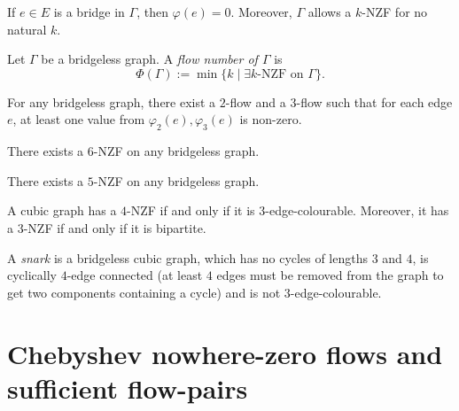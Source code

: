 \begin{claim}
    If $e\in E$ is a bridge in $\Gamma$, then $\varphi(e)=0$. Moreover, $\Gamma$ allows a $k$-NZF for no natural $k$.
\end{claim}

\begin{definition}
	Let $\Gamma$ be a bridgeless graph. A \emph{flow number of $\Gamma$} is
	\begin{equation*}
		\Phi(\Gamma) := \min\{k\mid\exists k\text{-NZF on }\Gamma\}.\label{eq:flow_number}
	\end{equation*}
\end{definition}

\begin{lemma} \emph{\cite[p. 132]{seymour}}
    For any bridgeless graph, there exist a $2$-flow and a $3$-flow such that for each edge $e$, at least one value from $\varphi_2(e), \varphi_3(e)$ is non-zero.\label{lem:2_flow_3_flow_seymour}
\end{lemma}

\begin{theorem} \emph{\cite[p. 133]{seymour}}
    There exists a $6$-NZF on any bridgeless graph.\label{th:6_flow}
\end{theorem}

\begin{conjecture} \emph{\cite[p. 83]{tutte}}
    There exists a $5$-NZF on any bridgeless graph.\label{conj:5_flow}
\end{conjecture}

\begin{proposition} \emph{\cite[pp. 160, 161]{diestel}}
    A cubic graph has a $4$-NZF if and only if it is $3$-edge-colourable. Moreover, it has a $3$-NZF if and only if it is bipartite.
\end{proposition}

\begin{definition}
    A \emph{snark} is a bridgeless cubic graph, which has no cycles of lengths $3$ and $4$, is cyclically $4$-edge connected (at least $4$ edges must be removed from the graph to get two components containing a cycle) and is not $3$-edge-colourable.
\end{definition}

\section{Chebyshev nowhere-zero flows and sufficient flow-pairs}


